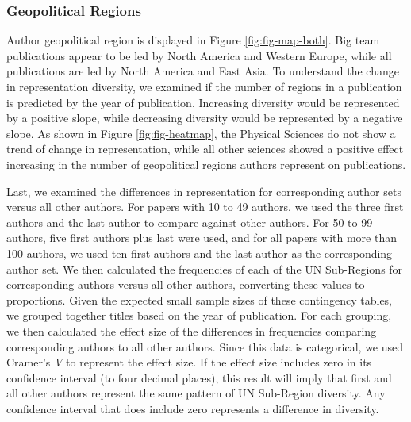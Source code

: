 \documentclass[
  man,mask,floatsintext]{apa7}
\begin{document}
\hypertarget{geopolitical-regions}{%
\subsubsection{Geopolitical Regions}\label{geopolitical-regions}}

Author geopolitical region is displayed in Figure
\ref{fig:fig-map-both}. Big team publications appear to be led by North
America and Western Europe, while all publications are led by North
America and East Asia. To understand the change in representation
diversity, we examined if the number of regions in a publication is
predicted by the year of publication. Increasing diversity would be
represented by a positive slope, while decreasing diversity would be
represented by a negative slope. As shown in Figure
\ref{fig:fig-heatmap}, the Physical Sciences do not show a trend of
change in representation, while all other sciences showed a positive
effect increasing in the number of geopolitical regions authors
represent on publications.

Last, we examined the differences in representation for corresponding
author sets versus all other authors. For papers with 10 to 49 authors,
we used the three first authors and the last author to compare against
other authors. For 50 to 99 authors, five first authors plus last were
used, and for all papers with more than 100 authors, we used ten first
authors and the last author as the corresponding author set. We then
calculated the frequencies of each of the UN Sub-Regions for
corresponding authors versus all other authors, converting these values
to proportions. Given the expected small sample sizes of these
contingency tables, we grouped together titles based on the year of
publication. For each grouping, we then calculated the effect size of
the differences in frequencies comparing corresponding authors to all
other authors. Since this data is categorical, we used Cramer's \emph{V} to
represent the effect size. If the effect size includes zero in its
confidence interval (to four decimal places), this result will imply
that first and all other authors represent the same pattern of UN
Sub-Region diversity. Any confidence interval that does include zero
represents a difference in diversity.
\end{document}
